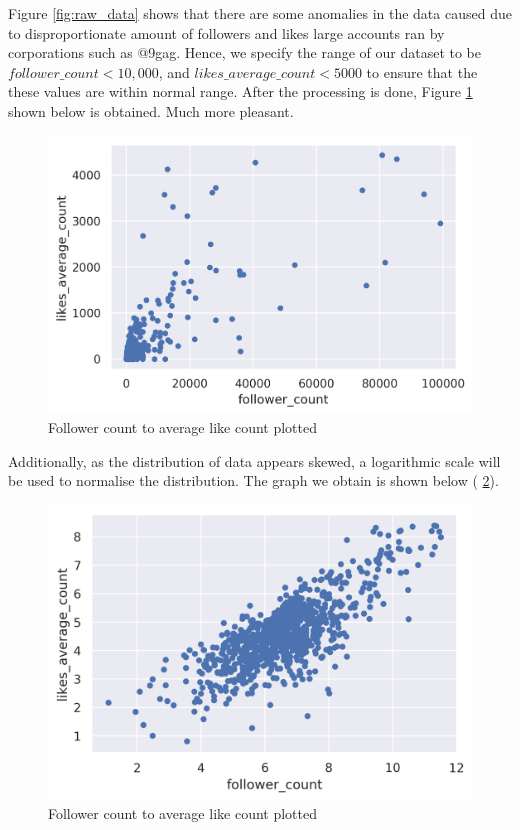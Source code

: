 \documentclass[11pt]{article}
\begin{document}
Figure \ref{fig:raw_data} shows that there are some anomalies in the data caused due to disproportionate amount of followers and likes large accounts ran by corporations such as @9gag. Hence, we specify the range of our dataset to be $\mathit{follower\_count} < 10,000$, and $\mathit{likes\_average\_count} < 5000$ to ensure that the these values are within normal range. After the processing is done, Figure \ref{fig:processed_data} shown below is obtained. Much more pleasant. \\

\begin{figure}[h!]
  \center
  \includegraphics[width=0.75\linewidth]{images/processed_data_graph.png}
  \caption{Follower count to average like count plotted}
  \label{fig:processed_data}
\end{figure}

Additionally, as the distribution of data appears skewed, a logarithmic scale will be used to normalise the distribution. The graph we obtain is shown below ( \ref{fig:log_data}).

\begin{figure}[h!]
  \center
  \includegraphics[width=0.75\linewidth]{images/log_data_graph.png}
  \caption{Follower count to average like count plotted}
  \label{fig:log_data}
\end{figure}
\end{document}
